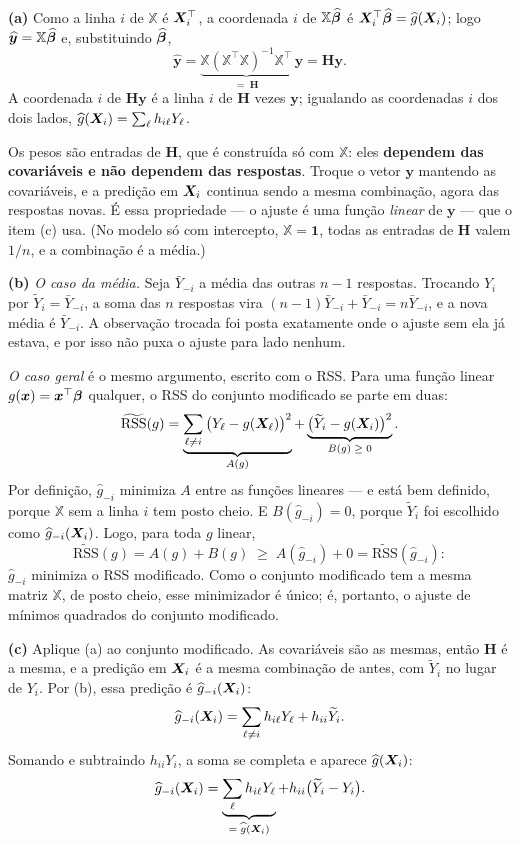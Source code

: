 \begin{solucao}
\textbf{(a)} Como a linha $i$ de $\mathbb{X}$ é $\bm{X}_i^\top$, a coordenada $i$ de
$\mathbb{X}\widehat{\bm{\beta}}$ é $\bm{X}_i^\top\widehat{\bm{\beta}}=\widehat g(\bm{X}_i)$; logo
$\widehat{\bm y}=\mathbb{X}\widehat{\bm{\beta}}$ e, substituindo $\widehat{\bm{\beta}}$,
\[
  \widehat{\bm y}
  =\underbrace{\mathbb{X}(\mathbb{X}^\top\mathbb{X})^{-1}\mathbb{X}^\top}_{=\;\bm H}\,\bm y
  =\bm H\bm y .
\]
A coordenada $i$ de $\bm H\bm y$ é a linha $i$ de $\bm H$ vezes $\bm y$; igualando as
coordenadas $i$ dos dois lados, $\widehat g(\bm{X}_i)=\sum_\ell h_{i\ell}Y_\ell$.

Os pesos são entradas de $\bm H$, que é construída só com $\mathbb{X}$: eles
\textbf{dependem das covariáveis e não dependem das respostas}. Troque o vetor $\bm y$
mantendo as covariáveis, e a predição em $\bm{X}_i$ continua sendo a mesma combinação,
agora das respostas novas. É essa propriedade --- o ajuste é uma função \emph{linear}
de $\bm y$ --- que o item (c) usa. (No modelo só com intercepto, $\mathbb{X}=\bm1$, todas
as entradas de $\bm H$ valem $1/n$, e a combinação é a média.)

\smallskip
\textbf{(b)} \emph{O caso da média.} Seja $\bar Y_{-i}$ a média das outras $n-1$
respostas. Trocando $Y_i$ por $\widetilde Y_i=\bar Y_{-i}$, a soma das $n$ respostas vira
$(n-1)\bar Y_{-i}+\bar Y_{-i}=n\bar Y_{-i}$, e a nova média é $\bar Y_{-i}$. A observação
trocada foi posta exatamente onde o ajuste sem ela já estava, e por isso não puxa o
ajuste para lado nenhum.

\emph{O caso geral} é o mesmo argumento, escrito com o RSS. Para uma função linear
$g(\bm{x})=\bm{x}^\top\bm{\beta}$ qualquer, o RSS do conjunto modificado se parte em duas:
\[
  \widetilde{\mathrm{RSS}}(g)
  =\underbrace{\sum_{\ell\neq i}\big(Y_\ell-g(\bm{X}_\ell)\big)^2}_{A(g)}
  +\underbrace{\big(\widetilde Y_i-g(\bm{X}_i)\big)^2}_{B(g)\;\ge\;0} .
\]
Por definição, $\widehat g_{-i}$ minimiza $A$ entre as funções lineares --- e está bem
definido, porque $\mathbb{X}$ sem a linha $i$ tem posto cheio. E $B(\widehat g_{-i})=0$,
porque $\widetilde Y_i$ foi escolhido como $\widehat g_{-i}(\bm{X}_i)$. Logo, para toda $g$
linear,
\[
  \widetilde{\mathrm{RSS}}(g)=A(g)+B(g)\;\ge\;A(\widehat g_{-i})+0
  =\widetilde{\mathrm{RSS}}(\widehat g_{-i}):
\]
$\widehat g_{-i}$ minimiza o RSS modificado. Como o conjunto modificado tem a mesma
matriz $\mathbb{X}$, de posto cheio, esse minimizador é único; é, portanto, o ajuste de
mínimos quadrados do conjunto modificado.

\smallskip
\textbf{(c)} Aplique (a) ao conjunto modificado. As covariáveis são as mesmas, então
$\bm H$ é a mesma, e a predição em $\bm{X}_i$ é a mesma combinação de antes, com
$\widetilde Y_i$ no lugar de $Y_i$. Por (b), essa predição é $\widehat g_{-i}(\bm{X}_i)$:
\[
  \widehat g_{-i}(\bm{X}_i)=\sum_{\ell\neq i}h_{i\ell}Y_\ell+h_{ii}\widetilde Y_i .
\]
Somando e subtraindo $h_{ii}Y_i$, a soma se completa e aparece $\widehat g(\bm{X}_i)$:
\[
  \widehat g_{-i}(\bm{X}_i)
  =\underbrace{\sum_{\ell}h_{i\ell}Y_\ell}_{=\;\widehat g(\bm{X}_i)}+h_{ii}\big(\widetilde Y_i-Y_i\big).
\]


\end{solucao}
